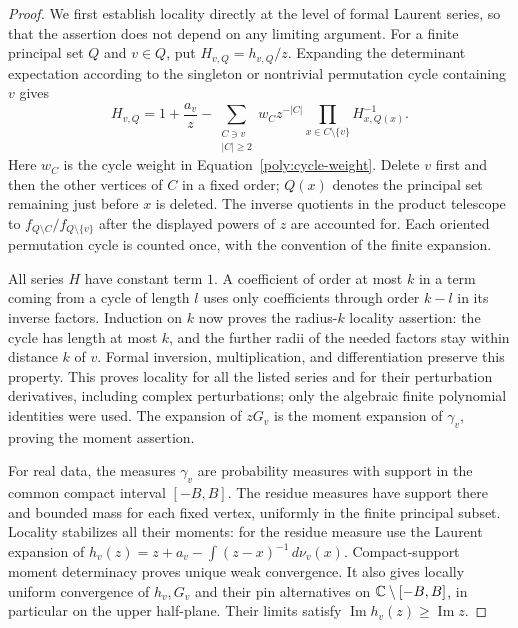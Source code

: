 \begin{proof}
We first establish locality directly at the level of formal Laurent
series, so that the assertion does not depend on any limiting
argument. For a finite principal set $Q$ and $v\in Q$, put
$H_{v,Q}=h_{v,Q}/z$. Expanding the determinant expectation according
to the singleton or nontrivial permutation cycle containing $v$
gives
\begin{equation}
 H_{v,Q}=1+\frac{a_v}{z}
 -\sum_{\substack{C\ni v\\ |C|\geq2}}
 w_Cz^{-|C|}
 \prod_{x\in C\setminus\{v\}}H_{x,Q(x)}^{-1}.
 \label{slab:local-expansion}
\end{equation}
Here $w_C$ is the cycle weight in Equation~\eqref{poly:cycle-weight}.
Delete $v$ first and then the other vertices of $C$ in a fixed order;
$Q(x)$ denotes the principal set remaining just before $x$ is
deleted. The inverse quotients in the product telescope to
$f_{Q\setminus C}/f_{Q\setminus\{v\}}$ after the displayed powers of
$z$ are accounted for. Each oriented permutation cycle is counted
once, with the convention of the finite expansion.

All series $H$ have constant term $1$. A coefficient of order at most
$k$ in a term coming from a cycle of length $l$ uses only coefficients
through order $k-l$ in its inverse factors. Induction on $k$ now proves
the radius-$k$ locality assertion: the cycle has length at most $k$,
and the further radii of the needed factors stay within distance $k$
of $v$. Formal inversion, multiplication, and differentiation preserve
this property. This proves locality for all the listed series and
for their perturbation derivatives, including complex perturbations;
only the algebraic finite polynomial identities were used.
The expansion of $zG_v$ is the moment expansion of $\gamma_v$, proving
the moment assertion.

For real data, the measures $\gamma_v$ are probability measures with
support in the common compact interval $[-B,B]$. The residue measures
have support there and bounded mass for each fixed vertex, uniformly
in the finite principal subset. Locality stabilizes all their moments:
for the residue measure use the Laurent expansion of
$h_v(z)=z+a_v-\int(z-x)^{-1}\,d\nu_v(x)$. Compact-support moment
determinacy proves unique weak convergence. It also gives locally
uniform convergence of $h_v,G_v$ and their pin alternatives on
$\mathbb C\setminus[-B,B]$, in particular on the upper half-plane. Their
limits satisfy $\operatorname{Im}h_v(z)\geq\operatorname{Im}z$.


\end{proof}
